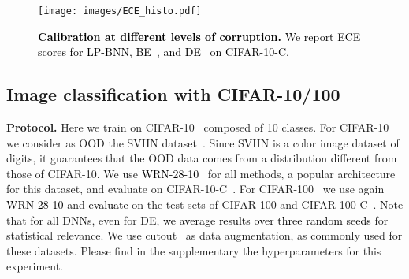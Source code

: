 \documentclass[10pt,twocolumn,letterpaper]{article}
\newcommand{\ab}[1]{\textcolor{black}{#1}}
\newcommand{\method}{LP-BNN\xspace}
\begin{document}
\begin{table*}[!t]
\begin{center}
{\begin{tabular}{l|ccccccc|cccc}
\end{tabular}
} \end{center}
\vspace{-2mm}
\caption{\ab{\textbf{Comparative results for image classification tasks}. We evaluate on CIFAR-10 and CIFAR-100 for the tasks: in-domain classification, out-of-distribution detection with SVHN (CIFAR-10 only), robustness to distribution shift (CIFAR-10-C, CIFAR-100-C)}. We run all methods ourselves in similar settings using publicly available code for related methods. Results are averaged over three seeds. \ab{: We did not manage to scale these methods to WRN-28-10 on CIFAR-100. A similar finding for EDL was reported in ~\cite{joo2020being}.  DUQ does not scale on CIFAR-100 and it does not perfectly scale to WRN-28-10 on CIFAR-10 so we train it with Resnet 18 \cite{he2016deep} architecture like in the original paper. }}
\label{table:tab1}
\vspace{-4mm}
\end{table*}




\begin{figure}[!t]
\renewcommand{\captionfont}{\small}
\centering
 \texttt{[image: images/ECE\_histo.pdf]}
\caption{ 
\ab{\textbf{Calibration at different levels of corruption.} We report ECE scores for \method, BE~\cite{wen2020batchensemble}, and DE~\cite{lakshminarayanan2017simple} on CIFAR-10-C.}
}
\label{fig:ECELBNN}
\end{figure}


        

\subsection{Image classification with CIFAR-10/100~\cite{krizhevsky2009learning}}\label{subsection:Experiments:cifar}
\noindent\textbf{Protocol.}
Here we train on CIFAR-10~\cite{krizhevsky2009learning} composed of 10 classes. For  CIFAR-10 we consider as OOD the SVHN dataset~\cite{Netzer2011}. Since SVHN is a color image dataset of digits, it guarantees that the OOD data comes from a distribution different from those of CIFAR-10.
We use 
\ab{WRN-28-10~\cite{zagoruyko2016wide}} for all methods, a popular architecture for this dataset, and evaluate on CIFAR-10-C~\cite{hendrycks2018benchmarking}. 
For CIFAR-100~\cite{krizhevsky2009learning} we use again 
\ab{WRN-28-10}
and 
\ab{evaluate} on the test sets of CIFAR-100 and 
CIFAR-100-C~\cite{hendrycks2018benchmarking}.
Note that for all DNNs, even for DE, 
\ab{we average results over three random seeds} for statistical relevance. We use cutout~\cite{devries2017improved} as data augmentation, as commonly used for these datasets. {Please find in the supplementary the hyperparameters for this experiment.}
\end{document}
